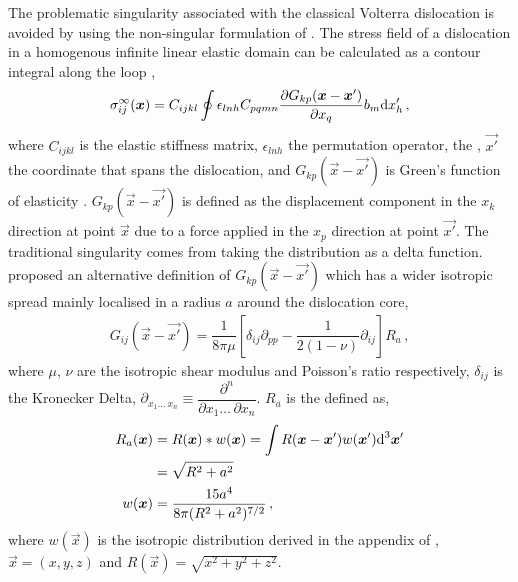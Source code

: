 		The problematic singularity associated with the classical Volterra dislocation is avoided by using the non-singular formulation of \citet{a_non-singular_continuum_theory_of_dislocations}. The stress field of a dislocation in a homogenous infinite linear elastic domain can be calculated as a contour integral along the loop \cite{mura_t},
		\begin{align}\label{e:field_stress}
			\sigma_{ij}^{\infty}(\vec{x}) = C_{ijkl} \oint \epsilon_{lnh} C_{pqmn} \dfrac{\partial G_{kp}(\vec{x} - \vec{x'})}{\partial x_{q}} b_{m} \rvar{d}x'_{h}\,,
		\end{align}
		where $ C_{ijkl} $ is the elastic stiffness matrix, $ \epsilon_{lnh} $ the permutation operator,  the , $ \vec{x'} $ the coordinate that spans the dislocation, and $ G_{kp}(\vec{x} - \vec{x'}) $ is Green's function of elasticity \cite{mura_t}. $ G_{kp}(\vec{x} - \vec{x'}) $ is defined as the displacement component in the $ x_{k} $ direction at point $ \vec{x} $ due to a force applied in the $ x_{p} $ direction at point $ \vec{x'} $. The traditional singularity comes from taking the  distribution as a delta function. \citet{a_non-singular_continuum_theory_of_dislocations} proposed an alternative definition of $ G_{kp}(\vec{x} - \vec{x'}) $ which has a wider isotropic spread mainly localised in a radius $ a $ around the dislocation core,
		\begin{align}\label{e:elastic_green_func}
			G_{ij}(\vec{x} - \vec{x'}) = \dfrac{1}{8\pi \mu}\left[ \delta_{ij} \partial_{pp} - \dfrac{1}{2(1-\nu)} \partial_{ij} \right] R_{a}\,,
		\end{align}
		where $ \mu $, $ \nu $ are the isotropic shear modulus and Poisson's ratio respectively, $ \delta_{ij} $ is the Kronecker Delta, $ \partial_{x_{1} \ldots\, x_{n}} \equiv \dfrac{\partial^{n}}{\partial x_{1} \ldots\, \partial x_{n}}$. $ R_{a} $ is the defined as,
		\begin{subequations}
			\begin{align}\label{e:ra}
				R_{a}(\vec{x}) &= R(\vec{x}) * w(\vec{x}) = \int R(\vec{x} - \vec{x'}) w(\vec{x'}) \rvar{d}^{3}\vec{x'}\nn
							   &= \sqrt{R^{2} + a^{2}}\\
				w(\vec{x})	   &= \dfrac{15 a^{4}}{8\pi (R^{2} + a^{2})^{7/2}}\,,
			\end{align}
		\end{subequations}
		where $ w(\vec{x}) $ is the isotropic  distribution derived in the appendix of \cite{a_non-singular_continuum_theory_of_dislocations}, $ \vec{x} = (x, y, z) $ and $ R(\vec{x}) = \sqrt{x^{2} + y^{2} + z^{2}} $.
		 
